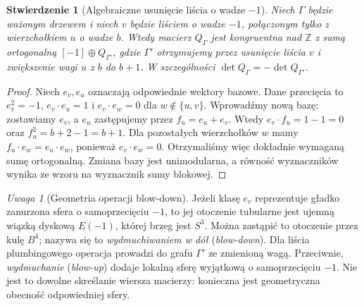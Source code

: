 \documentclass[11pt,a4paper]{report}
\numberwithin{equation}{section}
\theoremstyle{plain}
\newtheorem{stwierdzenie}[twierdzenie]{Stwierdzenie}
\theoremstyle{definition}
\theoremstyle{remark}
\newtheorem{uwaga}[twierdzenie]{Uwaga}
\begin{document}
\begin{stwierdzenie}[Algebraiczne usunięcie liścia o wadze $-1$]
Niech $\Gamma$ będzie ważonym drzewem i niech $v$
będzie liściem o wadze $-1$, połączonym tylko z
wierzchołkiem $u$ o wadze $b$. Wtedy macierz
$Q_\Gamma$ jest kongruentna nad $\mathbb Z$
z sumą ortogonalną $[-1]\oplus Q_{\Gamma'}$, gdzie
$\Gamma'$ otrzymujemy przez usunięcie liścia $v$
i zwiększenie wagi $u$ z $b$ do $b+1$.
W szczególności $\det Q_\Gamma=-\det Q_{\Gamma'}$.
\end{stwierdzenie}
\begin{proof}
Niech $e_v,e_u$ oznaczają odpowiednie wektory bazowe.
Dane przecięcia to $e_v^2=-1$, $e_v\cdot e_u=1$
i $e_v\cdot e_w=0$ dla $w\notin\{u,v\}$.
Wprowadźmy nową bazę: zostawiamy $e_v$, a $e_u$
zastępujemy przez $f_u=e_u+e_v$. Wtedy
$e_v\cdot f_u=1-1=0$ oraz
$f_u^2=b+2-1=b+1$. Dla pozostałych wierzchołków
$w$ mamy $f_u\cdot e_w=e_u\cdot e_w$, ponieważ
$e_v\cdot e_w=0$. Otrzymaliśmy więc dokładnie
wymaganą sumę ortogonalną. Zmiana bazy jest
unimodularna, a równość wyznaczników wynika ze wzoru
na wyznacznik sumy blokowej.
\end{proof}

\begin{uwaga}[Geometria operacji blow-down]
Jeżeli klasę $e_v$ reprezentuje gładko zanurzona sfera
o samoprzecięciu $-1$, to jej otoczenie tubularne jest
ujemną wiązką dyskową $E(-1)$, której brzeg jest
$S^3$. Można zastąpić to otoczenie przez kulę
$B^4$; nazywa się to \emph{wydmuchiwaniem w dół}
(\emph{blow-down}). Dla liścia plumbingowego operacja
prowadzi do grafu $\Gamma'$ ze zmienioną wagą.
Przeciwnie, \emph{wydmuchanie} (\emph{blow-up}) dodaje
lokalną sferę wyjątkową o samoprzecięciu $-1$.
Nie jest to dowolne skreślanie wiersza macierzy:
konieczna jest geometryczna obecność odpowiedniej sfery.
\end{uwaga}

\begin{center}
\end{center}
\end{document}
